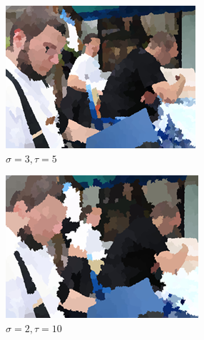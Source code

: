 \documentclass[12pt]{report}
\begin{document}
	\begin{figure}[h!]
		\centering
		\begin{subfigure}[b]{0.3\linewidth}
			\includegraphics[width=\linewidth]{resources/segm_3_5.png}
			\caption{$\sigma = 3, \tau = 5$}
		\end{subfigure}
		\begin{subfigure}[b]{0.3\linewidth}
			\includegraphics[width=\linewidth]{resources/segm_2_10.png}
			\caption{$\sigma = 2, \tau = 10$}
		\end{subfigure}
		\begin{subfigure}[b]{0.3\linewidth}

\end{subfigure}
\end{figure}
\end{document}
